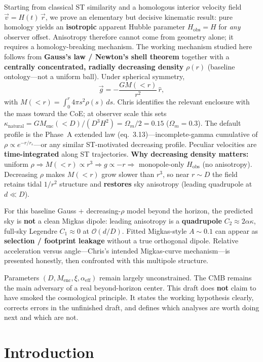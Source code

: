 \documentclass[11pt,a4paper]{article}
\begin{document}
Starting from classical ST similarity and a homologous interior velocity field \(\vec{v}=H(t)\,\vec{r}\), we prove an elementary but decisive kinematic result: pure homology yields an \textbf{isotropic} apparent Hubble parameter \(H_{\mathrm{obs}}=H\) for \emph{any} observer offset. Anisotropy therefore cannot come from geometry alone; it requires a homology-breaking mechanism. The working mechanism studied here follows from \textbf{Gauss's law / Newton's shell theorem} together with a \textbf{centrally concentrated, radially decreasing density} \(\rho(r)\) (baseline ontology---not a uniform ball). Under spherical symmetry,
\[
\vec{g}=-\frac{G M(<r)}{r^2}\,\hat{r},
\]
with \(M(<r)=\int_0^r 4\pi s^2\rho(s)\,ds\). Chris identifies the relevant enclosure with the mass toward the CoE; at observer scale this sets \(\kappa_{\mathrm{natural}}=G M_{\mathrm{enc}}(<D)/(D^3 H^2)=\Omega_m/2=0.15\) (\(\Omega_m=0.3\)). The default profile is the Phase~A extended law (eq.~3.13)---incomplete-gamma cumulative of \(\rho\propto e^{-r/r_s}\)---or any similar ST-motivated decreasing profile. Peculiar velocities are \textbf{time-integrated} along ST trajectories. \textbf{Why decreasing density matters:} uniform \(\rho\Rightarrow M(<r)\propto r^3\Rightarrow g\propto -r\Rightarrow\) monopole-only \(H_{\mathrm{obs}}\) (no anisotropy). Decreasing \(\rho\) makes \(M(<r)\) grow slower than \(r^3\), so near \(r\sim D\) the field retains tidal \(1/r^2\) structure and \textbf{restores} sky anisotropy (leading quadrupole at \(d\ll D\)).

For this baseline Gauss + decreasing-\(\rho\) model beyond the horizon, the predicted sky is \textbf{not} a clean Migkas dipole: leading anisotropy is a \textbf{quadrupole} \(C_2\approx 2\alpha\kappa\), full-sky Legendre \(C_1\approx 0\) at \(\mathcal{O}(d/D)\). Fitted Migkas-style \(A\sim 0.1\) can appear as \textbf{selection / footprint leakage} without a true orthogonal dipole. Relative acceleration versus angle---Chris's intended Migkas-curve mechanism---is presented honestly, then confronted with this multipole structure.

Parameters \((D,M_{\mathrm{enc}},\xi,\alpha_{\mathrm{eff}})\) remain largely unconstrained. The CMB remains the main adversary of a real beyond-horizon center. This draft does \textbf{not} claim to have smoked the cosmological principle. It states the working hypothesis clearly, corrects errors in the unfinished draft, and defines which analyses are worth doing next and which are not.

\section{Introduction}
\end{document}
